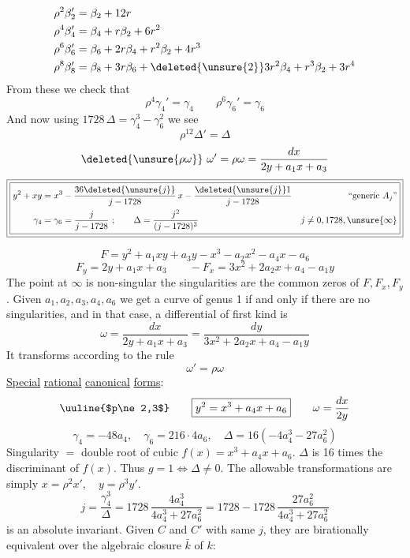 \[
\begin{aligned}
\rho^2\beta_2'&=\beta_2+12r\\
\rho^4\beta_4'&=\beta_4+r\beta_2+6r^2\\
\rho^6\beta_6'&=\beta_6+2r\beta_4+r^2\beta_2+4r^3\\
\rho^8\beta_8'&=\beta_8+3r\beta_6+\deleted{\unsure{2}}3r^2\beta_4+r^3\beta_2+3r^4
\end{aligned}
\]
From these we check that
\[
\rho^4\gamma_4'=\gamma_4\qquad\rho^6\gamma_6'=\gamma_6
\]
And now using $1728\,\Delta=\gamma_4^3-\gamma_6^2$ we see
\[
\rho^{12}\Delta'=\Delta
\]
\[
\deleted{\unsure{\rho\omega}}\ \omega'=\rho\omega=\frac{dx}{2y+a_1x+a_3}
\]
\[
\boxed{\boxed{\begin{aligned}
y^2+xy&=x^3-\frac{36\deleted{\unsure{j}}}{j-1728}\,x
-\frac{\deleted{\unsure{j}}1}{j-1728}
&\text{\textquotedblleft generic }A_j\text{\textquotedblright}\\
\gamma_4&=\gamma_6=\frac{j}{j-1728}\ ;\qquad
\Delta=\frac{j^2}{(j-1728)^3}
&j\ne0,1728,\unsure{\infty}
\end{aligned}}}
\]

\[
F=y^2+a_1xy+a_3y-x^3-a_2x^2-a_4x-a_6
\]
\[
F_y=2y+a_1x+a_3\qquad -F_x=3x^2+2a_2x+a_4-a_1y
\]
The point at $\infty$ is non-singular  the singularities are the common zeros of $F,F_x,F_y$. Given $a_1,a_2,a_3,a_4,a_6$ we get a curve of genus 1 if and only if there are no singularities, and in that case, a differential of first kind is
\[
\omega=\frac{dx}{2y+a_1x+a_3}=\frac{dy}{3x^2+2a_2x+a_4-a_1y}
\]
It transforms according to the rule
\[
\omega'=\rho\omega
\]
\uline{Special} \uline{rational} \uline{canonical} \uline{forms}:
\[
\text{\uuline{$p\ne2,3$}}\qquad
\boxed{y^2=x^3+a_4x+a_6}\qquad\omega=\frac{dx}{2y}
\]
\[
\gamma_4=-48a_4,\quad\gamma_6=216\cdot4a_6,\quad
\Delta=16(-4a_4^3-27a_6^2)
\]
Singularity $=$ double root of cubic $f(x)=x^3+a_4x+a_6$. $\Delta$ is 16 times the discriminant of $f(x)$. Thus $g=1\Longleftrightarrow\Delta\ne0$. The allowable transformations are simply $x=\rho^2x',\quad y=\rho^3y'$.
\[
j=\frac{\gamma_4^3}{\Delta}
=1728\,\frac{4a_4^3}{4a_4^3+27a_6^2}
=1728-1728\,\frac{27a_6^2}{4a_4^3+27a_6^2}
\]
is an absolute invariant. Given $C$ and $C'$ with same $j$, they are birationally equivalent over the algebraic closure $\bar{k}$ of $k$:

